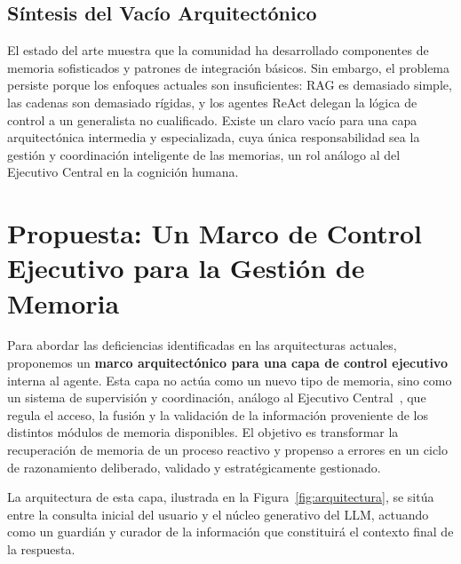 \documentclass[journal,onecolumn]{IEEEtran}
\begin{document}
\subsection{Síntesis del Vacío Arquitectónico}
El estado del arte muestra que la comunidad ha desarrollado componentes de memoria sofisticados y patrones de integración básicos. Sin embargo, el problema persiste porque los enfoques actuales son insuficientes: RAG es demasiado simple, las cadenas son demasiado rígidas, y los agentes ReAct delegan la lógica de control a un generalista no cualificado. Existe un claro vacío para una capa arquitectónica intermedia y especializada, cuya única responsabilidad sea la gestión y coordinación inteligente de las memorias, un rol análogo al del Ejecutivo Central en la cognición humana.

\section{Propuesta: Un Marco de Control Ejecutivo para la Gestión de Memoria}

Para abordar las deficiencias identificadas en las arquitecturas actuales, proponemos un \textbf{marco arquitectónico para una capa de control ejecutivo} interna al agente. Esta capa no actúa como un nuevo tipo de memoria, sino como un sistema de supervisión y coordinación, análogo al Ejecutivo Central~\cite{baddeley1974working}, que regula el acceso, la fusión y la validación de la información proveniente de los distintos módulos de memoria disponibles. El objetivo es transformar la recuperación de memoria de un proceso reactivo y propenso a errores en un ciclo de razonamiento deliberado, validado y estratégicamente gestionado.

La arquitectura de esta capa, ilustrada en la Figura~\ref{fig:arquitectura}, se sitúa entre la consulta inicial del usuario y el núcleo generativo del LLM, actuando como un guardián y curador de la información que constituirá el contexto final de la respuesta.
\end{document}
